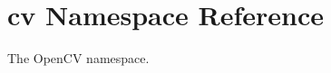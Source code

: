 \hypertarget{namespacecv}{}\section{cv Namespace Reference}
\label{namespacecv}


The Open\+CV namespace.  


